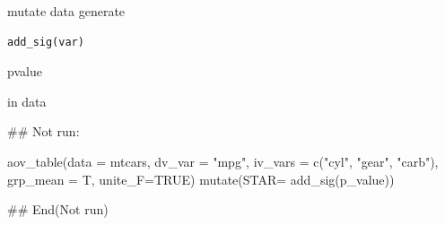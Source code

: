 \documentclass[a4paper]{book}
\begin{document}
%
\begin{Description}
mutate data generate
\end{Description}
%
\begin{Usage}
\begin{verbatim}
add_sig(var)
\end{verbatim}
\end{Usage}
%
\begin{Arguments}
\begin{ldescription}
\item[\code{p.value}] pvalue
\end{ldescription}
\end{Arguments}
%
\begin{Value}
in data
\end{Value}
%
\begin{Examples}
\begin{ExampleCode}

\#\# Not run: 

aov_table(data = mtcars, dv_var = "mpg",
iv_vars = c("cyl", "gear", "carb"), grp_mean = T,
unite_F=TRUE) %
 mutate(STAR= add_sig(p_value))


## End(Not run)
\end{ExampleCode}
\end{Examples}
\end{document}
